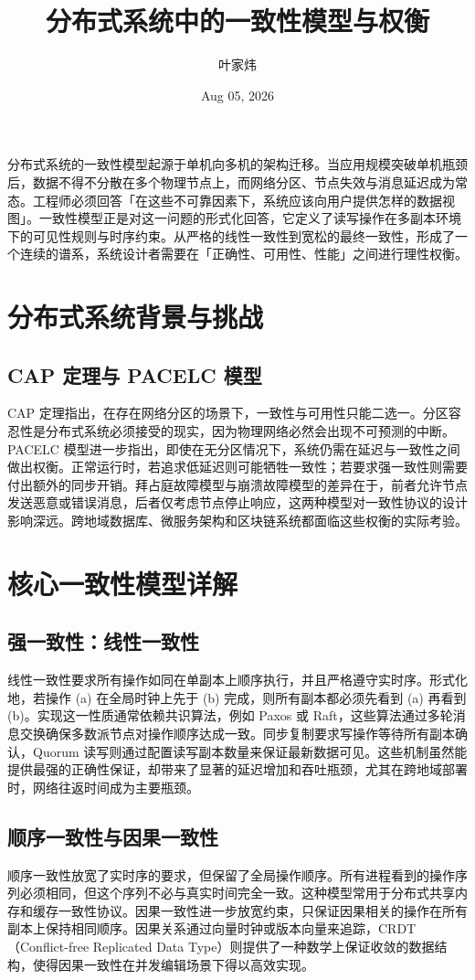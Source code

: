 \title{分布式系统中的一致性模型与权衡}
\author{叶家炜}
\date{Aug 05, 2026}
\maketitle
分布式系统的一致性模型起源于单机向多机的架构迁移。当应用规模突破单机瓶颈后，数据不得不分散在多个物理节点上，而网络分区、节点失效与消息延迟成为常态。工程师必须回答「在这些不可靠因素下，系统应该向用户提供怎样的数据视图」。一致性模型正是对这一问题的形式化回答，它定义了读写操作在多副本环境下的可见性规则与时序约束。从严格的线性一致性到宽松的最终一致性，形成了一个连续的谱系，系统设计者需要在「正确性、可用性、性能」之间进行理性权衡。\par
\chapter{分布式系统背景与挑战}
\section{CAP 定理与 PACELC 模型}
CAP 定理指出，在存在网络分区的场景下，一致性与可用性只能二选一。分区容忍性是分布式系统必须接受的现实，因为物理网络必然会出现不可预测的中断。PACELC 模型进一步指出，即使在无分区情况下，系统仍需在延迟与一致性之间做出权衡。正常运行时，若追求低延迟则可能牺牲一致性；若要求强一致性则需要付出额外的同步开销。拜占庭故障模型与崩溃故障模型的差异在于，前者允许节点发送恶意或错误消息，后者仅考虑节点停止响应，这两种模型对一致性协议的设计影响深远。跨地域数据库、微服务架构和区块链系统都面临这些权衡的实际考验。\par
\chapter{核心一致性模型详解}
\section{强一致性：线性一致性}
线性一致性要求所有操作如同在单副本上顺序执行，并且严格遵守实时序。形式化地，若操作 (a) 在全局时钟上先于 (b) 完成，则所有副本都必须先看到 (a) 再看到 (b)。实现这一性质通常依赖共识算法，例如 Paxos 或 Raft，这些算法通过多轮消息交换确保多数派节点对操作顺序达成一致。同步复制要求写操作等待所有副本确认，Quorum 读写则通过配置读写副本数量来保证最新数据可见。这些机制虽然能提供最强的正确性保证，却带来了显著的延迟增加和吞吐瓶颈，尤其在跨地域部署时，网络往返时间成为主要瓶颈。\par
\section{顺序一致性与因果一致性}
顺序一致性放宽了实时序的要求，但保留了全局操作顺序。所有进程看到的操作序列必须相同，但这个序列不必与真实时间完全一致。这种模型常用于分布式共享内存和缓存一致性协议。因果一致性进一步放宽约束，只保证因果相关的操作在所有副本上保持相同顺序。因果关系通过向量时钟或版本向量来追踪，CRDT（Conflict-free Replicated Data Type）则提供了一种数学上保证收敛的数据结构，使得因果一致性在并发编辑场景下得以高效实现。\par
